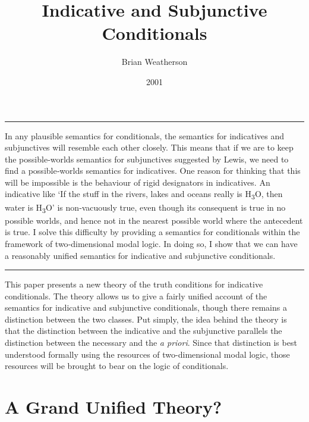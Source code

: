 \documentclass[
  10pt,
  letterpaper,
  DIV=11,
  numbers=noendperiod,
  twoside]{scrartcl}
\title{Indicative and Subjunctive Conditionals}
\author{Brian Weatherson}
\date{2001}
\renewenvironment{abstract}
 {\vspace{-1.25cm}
 \quotation\small\noindent\rule{\linewidth}{.5pt}\par\smallskip
 \noindent }
 {\par\noindent\rule{\linewidth}{.5pt}\endquotation}
\begin{document}
\maketitle
\begin{abstract}
In any plausible semantics for conditionals, the semantics for
indicatives and subjunctives will resemble each other closely. This
means that if we are to keep the possible‐worlds semantics for
subjunctives suggested by Lewis, we need to find a possible‐worlds
semantics for indicatives. One reason for thinking that this will be
impossible is the behaviour of rigid designators in indicatives. An
indicative like `If the stuff in the rivers, lakes and oceans really is
H\textsubscript{3}O, then water is H\textsubscript{3}O' is non‐vacuously
true, even though its consequent is true in no possible worlds, and
hence not in the nearest possible world where the antecedent is true. I
solve this difficulty by providing a semantics for conditionals within
the framework of two‐dimensional modal logic. In doing so, I show that
we can have a reasonably unified semantics for indicative and
subjunctive conditionals.
\end{abstract}


This paper presents a new theory of the truth conditions for indicative
conditionals. The theory allows us to give a fairly unified account of
the semantics for indicative and subjunctive conditionals, though there
remains a distinction between the two classes. Put simply, the idea
behind the theory is that the distinction between the indicative and the
subjunctive parallels the distinction between the necessary and the
\emph{a priori}. Since that distinction is best understood formally
using the resources of two-dimensional modal logic, those resources will
be brought to bear on the logic of conditionals.

\section{A Grand Unified Theory?}\label{a-grand-unified-theory}
\end{document}
